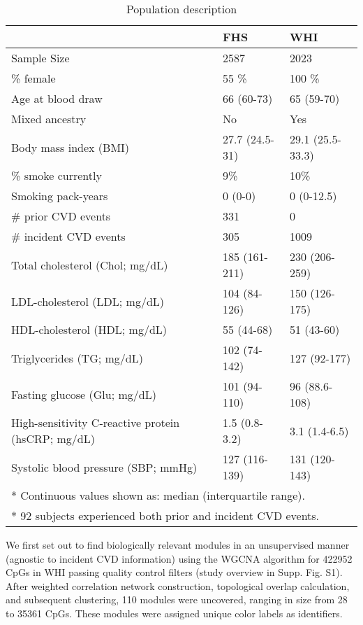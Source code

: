 \documentclass[]{bmcart}
\theoremstyle{definition}
\theoremstyle{definition}
\theoremstyle{definition}
\theoremstyle{remark}
\begin{document}
\begin{table}

\caption{\label{tab:population-description}Population description}
\centering
\begin{tabular}[t]{lll}
\toprule
  & FHS & WHI\\
\midrule
Sample Size & 2587 & 2023\\
\% female & 55 \% & 100 \%\\
Age at blood draw & 66 (60-73) & 65 (59-70)\\
Mixed ancestry & No & Yes\\
Body mass index (BMI) & 27.7 (24.5-31) & 29.1 (25.5-33.3)\\
\addlinespace
\% smoke currently & 9\% & 10\%\\
Smoking pack-years & 0 (0-0) & 0 (0-12.5)\\
\# prior CVD events & 331 & 0\\
\# incident CVD events & 305 & 1009\\
Total cholesterol (Chol; mg/dL) & 185 (161-211) & 230 (206-259)\\
\addlinespace
LDL-cholesterol (LDL; mg/dL) & 104 (84-126) & 150 (126-175)\\
HDL-cholesterol (HDL; mg/dL) & 55 (44-68) & 51 (43-60)\\
Triglycerides (TG; mg/dL) & 102 (74-142) & 127 (92-177)\\
Fasting glucose (Glu; mg/dL) & 101 (94-110) & 96 (88.6-108)\\
High-sensitivity C-reactive protein (hsCRP; mg/dL) & 1.5 (0.8-3.2) & 3.1 (1.4-6.5)\\
Systolic blood pressure (SBP; mmHg) & 127 (116-139) & 131 (120-143)\\
\bottomrule
\multicolumn{3}{l}{* Continuous values shown as: median (interquartile range).}\\
\multicolumn{3}{l}{* 92 subjects experienced both prior and incident CVD events.}\\
\end{tabular}
\end{table}

We first set out to find biologically relevant modules in an
unsupervised manner (agnostic to incident CVD information) using the
WGCNA algorithm for 422952 CpGs in WHI passing quality control filters
(study overview in Supp. Fig. S1). After weighted correlation network
construction, topological overlap calculation, and subsequent
clustering, 110 modules were uncovered, ranging in size from 28 to 35361
CpGs. These modules were assigned unique color labels as identifiers.
\end{document}
